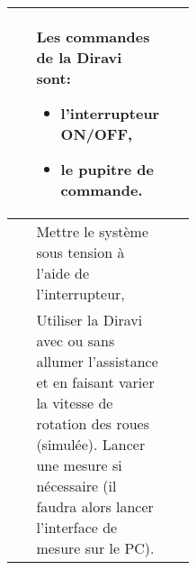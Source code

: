 

\begin{tabular}{|Ep{0.4\linewidth}|p{.5\linewidth}|}
\hline
& Les commandes de la Diravi sont:
\begin{itemize}
 \item l'interrupteur ON/OFF,
 \item le pupitre de commande.
\end{itemize}
&\tabularnewline\hline
& Mettre le système sous tension à l'aide de l'interrupteur,
&\tabularnewline\hline
 & Utiliser la Diravi avec ou sans allumer l'assistance et en faisant varier la vitesse de rotation des roues (simulée). Lancer une mesure si nécessaire (il faudra alors lancer l'interface de mesure sur le PC).
&\tabularnewline\hline
\end{tabular}


